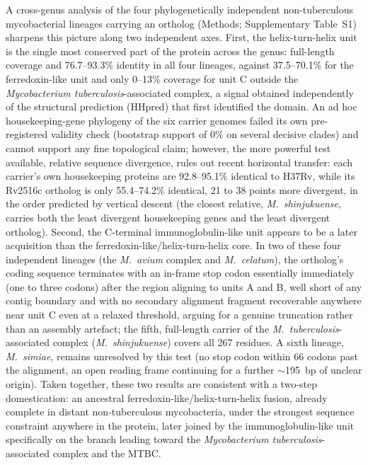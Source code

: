 \documentclass[11pt,a4paper]{article}
\newcommand{\mtb}{\textit{Mycobacterium tuberculosis}}
\begin{document}
A cross-genus analysis of the four phylogenetically independent non-tuberculous mycobacterial
lineages carrying an ortholog (Methods; Supplementary Table~S1) sharpens this picture along two independent axes. First, the
helix-turn-helix unit is the single most conserved part of the protein across the genus: full-length
coverage and 76.7--93.3\% identity in all four lineages, against 37.5--70.1\% for the ferredoxin-like
unit and only 0--13\% coverage for unit C outside the \mtb{}-associated complex, a signal obtained
independently of the structural prediction (HHpred) that first identified the domain. An ad hoc
housekeeping-gene phylogeny of the six carrier genomes failed its own pre-registered validity check
(bootstrap support of 0\% on several decisive clades) and cannot support any fine topological claim;
however, the more powerful test available, relative sequence divergence, rules out recent horizontal
transfer: each carrier's own housekeeping proteins are 92.8--95.1\% identical to H37Rv, while its
Rv2516c ortholog is only 55.4--74.2\% identical, 21 to 38 points more divergent, in the order
predicted by vertical descent (the closest relative, \textit{M.\ shinjukuense}, carries both the
least divergent housekeeping genes and the least divergent ortholog). Second, the C-terminal
immunoglobulin-like unit appears to be a later acquisition than the ferredoxin-like/helix-turn-helix
core. In two of these four independent lineages (the \textit{M.\ avium} complex and \textit{M.\
celatum}), the ortholog's coding sequence terminates with an in-frame stop codon essentially
immediately (one to three codons) after the region aligning to units A and B, well short of any
contig boundary and with no secondary alignment fragment recoverable anywhere near unit C even at a
relaxed threshold, arguing for a genuine truncation rather than an assembly artefact; the fifth,
full-length carrier of the \textit{M.\ tuberculosis}-associated complex (\textit{M.\ shinjukuense})
covers all 267 residues. A sixth lineage, \textit{M.\ simiae}, remains unresolved by this test (no
stop codon within 66 codons past the alignment, an open reading frame continuing for a further
$\sim$195~bp of unclear origin). Taken together, these two results are consistent with a two-step
domestication: an ancestral ferredoxin-like/helix-turn-helix fusion, already complete in distant
non-tuberculous mycobacteria, under the strongest sequence constraint anywhere in the protein, later
joined by the immunoglobulin-like unit specifically on the branch leading toward the \mtb{}-associated
complex and the MTBC.
\end{document}
